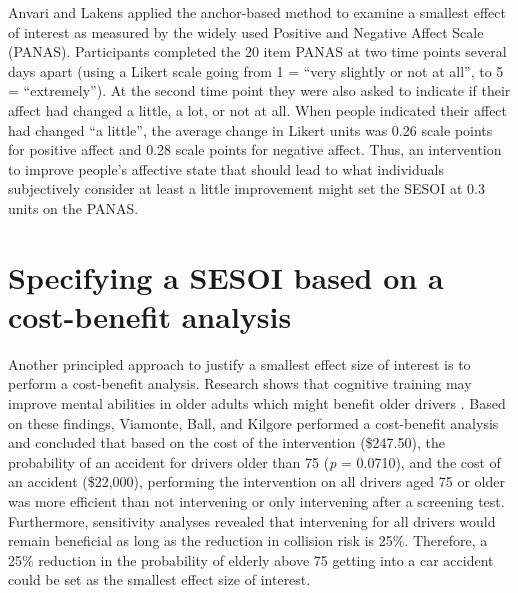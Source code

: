 \documentclass[
  oneside]{krantz}
\begin{document}
Anvari and Lakens \citeyearpar{anvari_using_2021} applied the anchor-based method to examine a smallest effect of interest as measured by the widely used Positive and Negative Affect Scale (PANAS). Participants completed the 20 item PANAS at two time points several days apart (using a Likert scale going from 1 = ``very slightly or not at all'', to 5 = ``extremely''). At the second time point they were also asked to indicate if their affect had changed a little, a lot, or not at all. When people indicated their affect had changed ``a little'', the average change in Likert units was 0.26 scale points for positive affect and 0.28 scale points for negative affect. Thus, an intervention to improve people's affective state that should lead to what individuals subjectively consider at least a little improvement might set the SESOI at 0.3 units on the PANAS.

\hypertarget{specifying-a-sesoi-based-on-a-cost-benefit-analysis}{%
\section{Specifying a SESOI based on a cost-benefit analysis}\label{specifying-a-sesoi-based-on-a-cost-benefit-analysis}}

Another principled approach to justify a smallest effect size of interest is to perform a cost-benefit analysis. Research shows that cognitive training may improve mental abilities in older adults which might benefit older drivers \citep{ball_effects_2002}. Based on these findings, Viamonte, Ball, and Kilgore \citeyearpar{viamonte_cost-benefit_2006} performed a cost-benefit analysis and concluded that based on the cost of the intervention (\$247.50), the probability of an accident for drivers older than 75 (\emph{p} = 0.0710), and the cost of an accident (\$22,000), performing the intervention on all drivers aged 75 or older was more efficient than not intervening or only intervening after a screening test. Furthermore, sensitivity analyses revealed that intervening for all drivers would remain beneficial as long as the reduction in collision risk is 25\%. Therefore, a 25\% reduction in the probability of elderly above 75 getting into a car accident could be set as the smallest effect size of interest.
\end{document}

